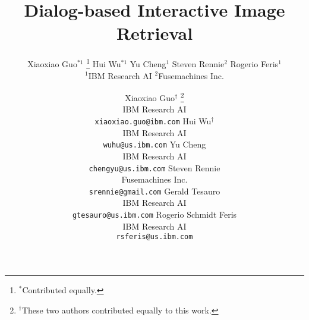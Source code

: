 \documentclass{article}
\title{Dialog-based Interactive Image Retrieval}
\author{
  Xiaoxiao Guo$^{*1}$ \thanks{$^{*}$Contributed equally. 
  } \phantom{a} Hui Wu$^{*1}$ \phantom{a} Yu Cheng$^{1}$ \phantom{a}  Steven Rennie$^{2}$ \phantom{a} Rogerio Feris$^{1}$  \\
  $^{1}$IBM Research AI \phantom{AND} $^{2}$Fusemachines Inc. 
}
\author{
  Xiaoxiao Guo$^{\dagger}$ \thanks{$^{\dagger}$These two authors contributed equally to this work. } \\
  IBM Research AI\\
  \texttt{xiaoxiao.guo@ibm.com}
  \And
  Hui Wu$^{\dagger}$ \\
  IBM Research AI\\
  \texttt{wuhu@us.ibm.com}
  \And
  Yu Cheng \\
  IBM Research AI\\
  \texttt{chengyu@us.ibm.com}
  \And
  Steven Rennie \\
  Fusemachines Inc.  \\
  \texttt{srennie@gmail.com}
  \And
 Gerald Tesauro \\
  IBM Research AI\\
  \texttt{gtesauro@us.ibm.com}
  \And
  Rogerio Schmidt Feris \\
  IBM Research AI\\
  \texttt{rsferis@us.ibm.com}
}
\begin{document}

\maketitle

\begin{abstract}
\begin{comment}
Inspired by the enormous growth of huge online media collections of many types (e.g. images, audio, video, e-books, etc.), and the paucity of intelligent retrieval systems, 
this paper introduces a novel approach to interactive visual content 
retrieval.  The proposed retrieval framework is guided by free-form natural language feedback from users, allowing for more natural and effective communication. 
Such a framework constitutes a multi-modal dialog protocol where in each dialog turn, a user submits a natural language request to a retrieval agent, which then attempts to retrieve the optimal object.
We formulate the retrieval task
as a reinforcement learning problem, and reward the dialog system for improving the 
rank of the target object during each dialog turn. This
framework can be applied to a variety of visual media types (images, videos, graphics, etc.),
and in this paper, we study in-depth its application on the task of interactive image retrieval.
To avoid the cumbersome and costly process of collecting human-machine conversations 
as the dialog system learns, we train the dialog system with 
a user simulator, which is itself trained to describe the differences between 
target and retrieved images.  The efficacy of our approach is demonstrated in a footwear image retrieval application.  Extensive experiments on both simulated and real-world data show that: 1) our proposed learning framework achieves better accuracy than other supervised and reinforcement learning baselines; and 2) user feedback based on natural language rather than pre-specified attributes leads to more effective retrieval results, and a more natural and expressive communication interface. 
\end{comment}


\end{abstract}
\end{document}
